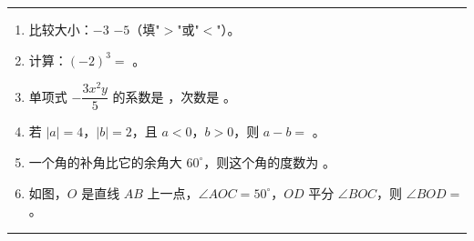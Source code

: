 \documentclass[12pt, a4paper]{ctexart}
\newcommand{\blank}[1]{\underline{\hspace{#1}}}
\begin{document}
\vspace{10pt}
\noindent\rule{\textwidth}{0.8pt}

\vspace{8pt}

\vspace{6pt}

\begin{enumerate}[label=\textbf{\arabic*.}, leftmargin=2.5em, resume]

\item 比较大小：$-3$ \blank{1.5cm} $-5$（填"$>$"或"$<$"）。

\vspace{6pt}

\item 计算：$(-2)^3 = $ \blank{2cm} 。

\vspace{6pt}

\item 单项式 $-\dfrac{3x^2y}{5}$ 的系数是 \blank{2cm} ，次数是 \blank{2cm} 。

\vspace{6pt}

\item 若 $|a| = 4$，$|b| = 2$，且 $a < 0$，$b > 0$，则 $a - b = $ \blank{2cm} 。

\vspace{6pt}

\item 一个角的补角比它的余角大 $60^{\circ}$，则这个角的度数为 \blank{2cm} 。

\vspace{6pt}

\item 如图，$O$ 是直线 $AB$ 上一点，$\angle AOC = 50^{\circ}$，$OD$ 平分 $\angle BOC$，则 $\angle BOD = $ \blank{2cm} 。

\end{enumerate}

\vspace{10pt}
\noindent\rule{\textwidth}{0.8pt}

\vspace{8pt}

\vspace{6pt}
\end{document}
